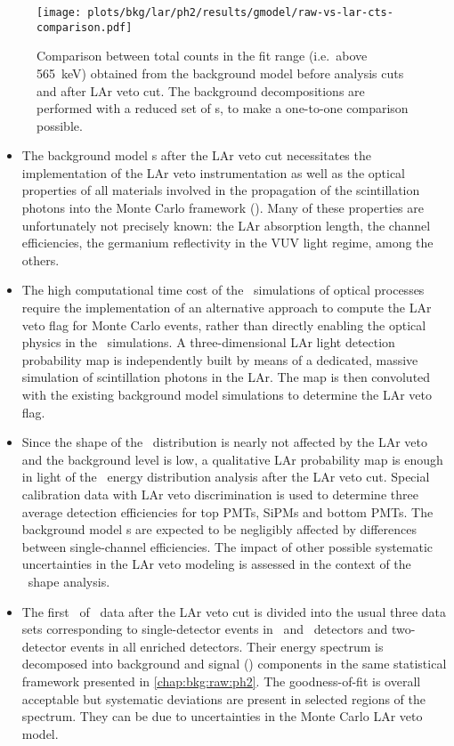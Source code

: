 \begin{figure}
  \centering
  \texttt{[image: plots/bkg/lar/ph2/results/gmodel/raw-vs-lar-cts-comparison.pdf]}
  \caption{%
    Comparison between total counts in the fit range (i.e.~above 565~keV) obtained from
    the background model before analysis cuts and after LAr veto cut. The background
    decompositions are performed with a reduced set of \pdf{}s, to make a one-to-one
    comparison possible.
  }\label{fig:bkg:lar:ph2:cts-comparison}
\end{figure}

\chapendgliph{}

\chapsummary
\begin{itemize}
  \item The background model \pdf{}s after the LAr veto cut necessitates the implementation
    of the LAr veto instrumentation as well as the optical properties of all materials
    involved in the propagation of the scintillation photons into the Monte Carlo
    framework (\mage). Many of these properties are unfortunately not precisely known: the
    LAr absorption length, the channel efficiencies, the germanium reflectivity in the VUV
    light regime, among the others.
  \item The high computational time cost of the \geant\ simulations of optical processes
    require the implementation of an alternative approach to compute the LAr veto flag for
    Monte Carlo events, rather than directly enabling the optical physics in the \mage\
    simulations. A three-dimensional LAr light detection probability map is independently
    built by means of a dedicated, massive simulation of scintillation photons in the LAr.
    The map is then convoluted with the existing background model simulations to determine
    the LAr veto flag.
  \item Since the shape of the \nnbb\ distribution is nearly not affected by the LAr veto
    and the background level is low, a qualitative LAr probability map is enough in light
    of the \nnbb\ energy distribution analysis after the LAr veto cut. Special calibration
    data with LAr veto discrimination is used to determine three average detection
    efficiencies for top PMTs, SiPMs and bottom PMTs. The background model \pdf{}s are
    expected to be negligibly affected by differences between single-channel efficiencies.
    The impact of other possible systematic uncertainties in the LAr veto modeling is
    assessed in the context of the \nnbb\ shape analysis.
  \item The first \gexpophasetwobkg\ of \phasetwo\ data after the LAr veto cut is divided
    into the usual three data sets corresponding to single-detector events in \bege\ and
    \scoax\ detectors and two-detector events in all enriched detectors. Their energy
    spectrum is decomposed into background and signal (\nnbb) components in the same
    statistical framework presented in \cref{chap:bkg:raw:ph2}. The goodness-of-fit is
    overall acceptable but systematic deviations are present in selected regions of the
    spectrum. They can be due to uncertainties in the Monte Carlo LAr veto model.
\end{itemize}


